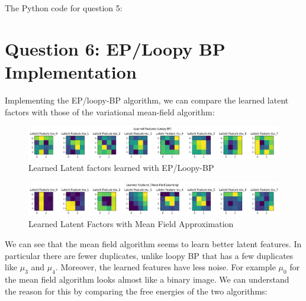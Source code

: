 \documentclass[12pt]{article}
\begin{document}
\newpage
The Python code for question 5:



\newpage
\section*{Question 6: EP/Loopy BP Implementation}

Implementing the EP/loopy-BP algorithm, we can compare the learned latent factors with those of the variational mean-field algorithm:

\begin{figure}[h]
\centering
\includegraphics[scale=0.4]{outputs/q6/all-latent-factors}
\caption{Learned Latent factors learned with EP/Loopy-BP}
\label{fig:6-latent-factors}
\end{figure}

\begin{figure}[h]
\centering
\includegraphics[scale=0.4]{outputs/q3/f-latent-factors}
\caption{Learned Latent Factors with Mean Field Approximation}
\label{fig:3f-latent-factors}
\end{figure}

We can see that the mean field algorithm seems to learn better latent features. In particular there are fewer duplicates, unlike loopy BP that has a few duplicates like $\mu_3$ and $\mu_4$. Moreover, the learned features have less noise. For example $\mu_0$ for the mean field algorithm looks almost like a binary image. We can understand the reason for this by comparing the free energies of the two algorithms:
\end{document}
